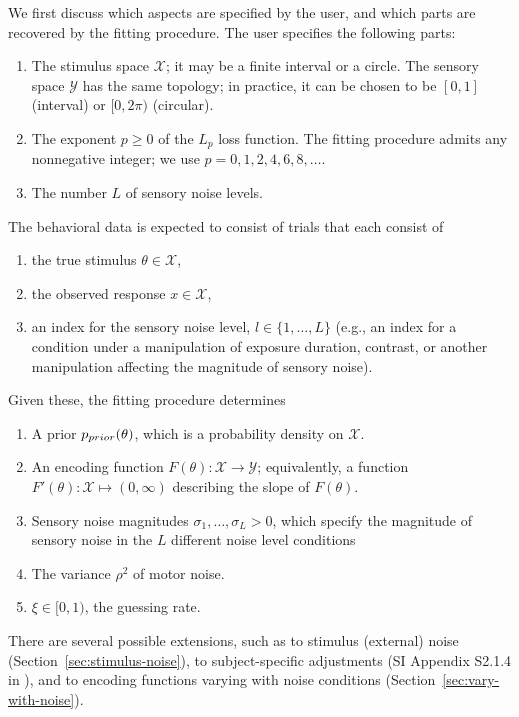We first discuss which aspects are specified by the user, and which parts are recovered by the fitting procedure.
The user specifies the following parts:
\begin{enumerate}
\item The stimulus space $\mathcal{X}$; it may be a finite interval or a circle.
The  sensory space $\mathcal{Y}$ has the same topology; in practice, it can be chosen to be $[0,1]$ (interval) or $[0,2\pi)$ (circular).
\item The exponent $p \geq 0$ of the $L_p$ loss function. The fitting procedure admits any nonnegative integer; we use $p=0,1,2,4,6,8,\dots$.
\item The number $L$ of sensory noise levels.
\end{enumerate}
The behavioral data is expected to consist of trials that each consist of
\begin{enumerate}
\item the true stimulus $\theta \in \mathcal{X}$,
\item the observed response $x \in \mathcal{X}$,
\item an index for the sensory noise level, $l \in \{1, \dots, L\}$ (e.g., an index for a condition under a manipulation of exposure duration, contrast, or another manipulation affecting the magnitude of sensory noise).
\end{enumerate}
Given these, the fitting procedure determines
\begin{enumerate}
	\item A prior $p_{prior}(\theta)$, which is a probability density on $\mathcal{X}$.
	\item An encoding function $F(\theta) : \mathcal{X} \rightarrow \mathcal{Y}$; equivalently, a function $F'(\theta) : \mathcal{X} \mapsto (0,\infty)$ describing the slope of $F(\theta)$.
	\item Sensory noise magnitudes  $\sigma_1, \dots, \sigma_L > 0$, which specify the magnitude of sensory noise in the $L$ different noise level conditions
        \item The variance  $\rho^2$ of motor noise. 
	\item $\xi \in [0,1)$, the guessing rate.
\end{enumerate}
There are several possible extensions, such as to stimulus (external) noise (Section~\ref{sec:stimulus-noise}), to subject-specific adjustments (SI Appendix S2.1.4 in \citet{hahn2024unifying}), and to encoding functions varying with noise conditions (Section~\ref{sec:vary-with-noise}).

